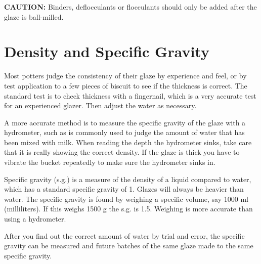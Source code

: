\textbf{CAUTION:} Binders, deflocculants or flocculants should only be added 
after the glaze is ball-milled.
\section{Density and Specific Gravity}
Most potters judge the consistency of their glaze by experience and feel, or by 
test application to a few pieces of biscuit to see if the thickness is correct. 
The standard test is to check thickness with a fingernail, which is a very 
accurate test for an experienced glazer. Then adjust the water as necessary.

A more accurate method is to measure the specific gravity of the glaze with a 
hydrometer, such as is commonly used to judge the amount of water that has been 
mixed with milk. When reading the depth the hydrometer sinks, take care that it 
is really showing the correct density. If the glaze is thick you have to 
vibrate the bucket repeatedly to make sure the hydrometer sinks in.

Specific gravity (s.g.) is a measure of the density of a liquid compared to 
water, which has a standard specific gravity of 1. Glazes will always be 
heavier than water. The specific gravity is found by weighing a specific 
volume, say 1000 ml (milliliters). If this weighs 1500 g the s.g. is 1.5. 
Weighing is more accurate than using a hydrometer.

After you find out the correct amount of water by trial and error, the specific 
gravity can be measured and future batches of the same glaze made to the same 
specific gravity.

